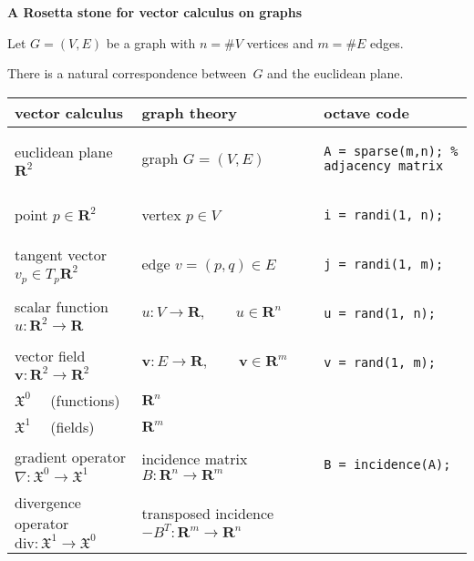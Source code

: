 \documentclass{article}
\def\R{\mathbf{R}}
\begin{document}
{\bf A Rosetta stone for vector calculus on graphs}

Let $G=(V,E)$ be a graph with $n=\#V$ vertices and $m=\#E$ edges.

There is a natural correspondence between~$G$ and the euclidean plane.

\bigskip

\setlength{\extrarowheight}{3pt}
\begin{tabular}{l|l|b{}}
\bf vector calculus & \bf graph theory & \bf octave code \\
\hline
euclidean plane $\R^2$ & graph $G=(V,E)$ &
\begin{verbatim}
A = sparse(m,n); % adjacency matrix
\end{verbatim}
\\
point $p\in\R^2$ & vertex $p\in V$ &
\begin{verbatim}
i = randi(1, n);
\end{verbatim}
\\
tangent vector $v_p\in T_p\R^2$ & edge $v=(p,q)\in E$ &
\begin{verbatim}
j = randi(1, m);
\end{verbatim}
\\
scalar function $u:\R^2\to\R$ & $u:V\to\R,\qquad u\in\R^n$ &
\begin{verbatim}
u = rand(1, n);
\end{verbatim}
\\
vector field $\mathbf{v}:\R^2\to\R^2$ & $\mathbf{v}:E\to\R,\qquad\mathbf{v}\in\R^m$&
\begin{verbatim}
v = rand(1, m);
\end{verbatim}
\\
$\mathfrak{X}^0\quad$ \color{gray}(functions) & $\R^n$ & \\
$\mathfrak{X}^1\quad$ \color{gray}(fields) & $\R^m$ & \\
gradient operator $\nabla:\mathfrak{X}^0\to\mathfrak{X}^1$ &
incidence matrix $B:\R^n\to\R^m$ &
\begin{verbatim}
B = incidence(A);
\end{verbatim}
\\
divergence operator $\mathrm{div}:\mathfrak{X}^1\to\mathfrak{X}^0$ &
transposed incidence $-B^T:\R^m\to\R^n$ &
\begin{verbatim}

\end{verbatim}
\end{tabular}
\end{document}
